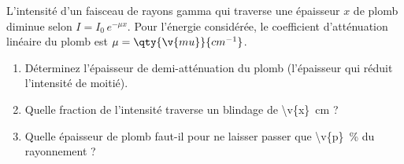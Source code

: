 L'intensité d'un faisceau de rayons gamma qui traverse une épaisseur $x$ de plomb diminue selon $I = I_0\,e^{-\mu x}$. Pour l'énergie considérée, le coefficient d'atténuation linéaire du plomb est $\mu = \qty{\v{mu}}{cm^{-1}}$.

\begin{enumerate}[label=\alph*)]
    \item Déterminez l'épaisseur de demi-atténuation du plomb (l'épaisseur qui réduit l'intensité de moitié).
    \item Quelle fraction de l'intensité traverse un blindage de \qty{\v{x}}{cm} ?
    \item Quelle épaisseur de plomb faut-il pour ne laisser passer que \qty{\v{p}}{\percent} du rayonnement ?
\end{enumerate}
